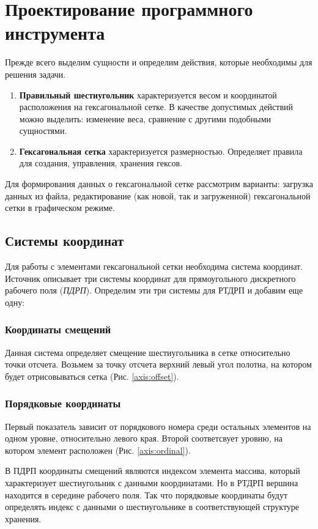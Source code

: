 \chapter{Проектирование программного инструмента}
\label{cha:ch_2}

Прежде всего выделим сущности и определим действия, которые необходимы для решения задачи.

\begin{enumerate}
\item \textbf{Правильный шестиугольник} характеризуется весом и координатой расположения на гексагональной сетке. В качестве допустимых действий можно выделить: изменение веса, сравнение с другими подобными сущностями.
\item \textbf{Гексагональная сетка} характеризуется размерностью. Определяет правила для создания, управления, хранения гексов. 
\end{enumerate}
Для формирования данных о гексагональной сетке рассмотрим варианты: загрузка данных из файла, редактирование (как новой, так и загруженной) гексагональной сетки в графическом режиме.

\section{Системы координат}
Для работы с элементами гексагональной сетки необходима система координат. Источник \cite{red} описывает три системы координат для прямоугольного дискретного 
рабочего поля (\textit{ПДРП}). Определим эти три системы для РТДРП и добавим еще одну: 

\subsection{Координаты смещений}
 Данная система определяет смещение шестиугольника в сетке относительно точки отсчета. Возьмем за точку отсчета верхний левый угол полотна, на котором будет отрисовываться сетка (Рис. \ref{axis:offset}).

\subsection{Порядковые координаты}
\label{design:ordinal_axis}
Первый показатель зависит от порядкового номера среди остальных элементов на одном уровне, относительно левого края. Второй соответсвует уровню, на котором элемент расположен (Рис. \ref{axis:ordinal}).\par
В ПДРП координаты смещений являются индексом элемента массива, 
который характеризует шестиугольник с данными координатами. Но в РТДРП вершина находится в середине рабочего поля. Так что порядковые координаты будут определять индекс с данными о шестиугольнике в соответствующей структуре хранения. 

